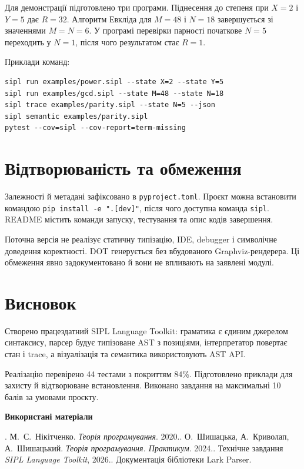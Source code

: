 \documentclass[12pt,a4paper]{article}
\newcommand{\code}[1]{\texttt{#1}}
\begin{document}
Для демонстрації підготовлено три програми. Піднесення до степеня при
$X=2$ і $Y=5$ дає $R=32$. Алгоритм Евкліда для $M=48$ і $N=18$
завершується зі значеннями $M=N=6$. У програмі перевірки парності початкове
$N=5$ переходить у $N=1$, після чого результатом стає $R=1$.

Приклади команд:

\begin{verbatim}
sipl run examples/power.sipl --state X=2 --state Y=5
sipl run examples/gcd.sipl --state M=48 --state N=18
sipl trace examples/parity.sipl --state N=5 --json
sipl semantic examples/parity.sipl
pytest --cov=sipl --cov-report=term-missing
\end{verbatim}

\section{Відтворюваність та обмеження}

Залежності й метадані зафіксовано в \code{pyproject.toml}. Проєкт можна
встановити командою \code{pip install -e ".[dev]"}, після чого доступна
команда \code{sipl}. README містить команди запуску, тестування та опис
кодів завершення.

Поточна версія не реалізує статичну типізацію, IDE, debugger і символічне
доведення коректності. DOT генерується без вбудованого Graphviz-рендерера.
Ці обмеження явно задокументовано й вони не впливають на заявлені модулі.

\enlargethispage{1\baselineskip}
\section{Висновок}

Створено працездатний SIPL Language Toolkit: граматика є єдиним джерелом
синтаксису, парсер будує типізоване AST з позиціями, інтерпретатор повертає
стан і trace, а візуалізація та семантика використовують AST API.

Реалізацію перевірено 44 тестами з покриттям 84\%. Підготовлено приклади
для захисту й відтворюване встановлення. Виконано завдання на максимальні
10 балів за умовами проєкту.

\vspace{0.2em}
\noindent\textbf{Використані матеріали}

\begingroup
\footnotesize
{}. М.~С.~Нікітченко. \emph{Теорія програмування}. 2020.. О.~Шишацька, А.~Криволап, А.~Шишацький. \emph{Теорія програмування. Практикум}. 2024.. Технічне завдання \emph{SIPL Language Toolkit}, 2026.. Документація бібліотеки Lark Parser.
\endgroup
\end{document}
